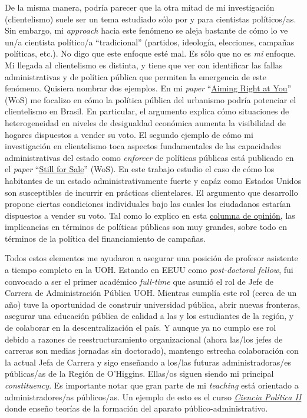 \documentclass[12pt,stdletter,dateno,sigleft]{newlfm} %
\begin{document}
\begin{newlfm}
De la misma manera, podr\'ia parecer que la otra mitad de mi investigaci\'on (clientelismo) suele ser un tema estudiado s\'olo por y para cientistas pol\'iticos/as. Sin embargo, mi \emph{approach} hacia este fen\'omeno se aleja bastante de c\'omo lo ve un/a cientista pol\'itico/a ``tradicional'' (partidos, ideolog\'ia, elecciones, campa\~nas pol\'iticas, etc.). No digo que este enfoque est\'e mal. Es s\'olo que no es \emph{mi} enfoque. Mi llegada al clientelismo es distinta, y tiene que ver con identificar las fallas administrativas y de pol\'itica p\'ublica que permiten la emergencia de este fen\'omeno. Quisiera nombrar dos ejemplos. En mi \emph{paper} ``\href{https://journals.sub.uni-hamburg.de/giga/jpla/article/view/1121/1128}{Aiming Right at You}'' (WoS) me focalizo en c\'omo la pol\'itica p\'ublica del urbanismo podr\'ia potenciar el clientelismo en Brasil. En particular, el argumento explica c\'omo situaciones de heterogeneidad en niveles de desigualdad econ\'omica aumenta la visibilidad de hogares dispuestos a vender su voto. El segundo ejemplo de c\'omo mi investigaci\'on en clientelismo toca aspectos fundamentales de las capacidades administrativas del estado como \emph{enforcer} de pol\'iticas p\'ublicas est\'a publicado en el \emph{paper} ``\href{https://doi.org/10.1057/s41269-020-00174-4}{Still for Sale}'' (WoS). En este trabajo estudio el caso de c\'omo los habitantes de un estado administrativamente fuerte y cap\'az como Estados Unidos son susceptibles de incurrir en pr\'acticas clientelares. El argumento que desarrollo propone ciertas condiciones individuales bajo las cuales los ciudadanos estar\'ian dispuestos a vender su voto. Tal como lo explico en esta \href{https://eltipografo.cl/2019/07/desigualdad-y-democracia-en-chile}{columna de opini\'on}, las implicancias en t\'erminos de pol\'iticas p\'ublicas son muy grandes, sobre todo en t\'erminos de la pol\'itica del financiamiento de campa\~nas.

Todos estos elementos me ayudaron a asegurar una posici\'on de profesor asistente a tiempo completo en la UOH. Estando en EEUU como \emph{post-doctoral fellow}, fui convocado a ser el primer acad\'emico \emph{full-time} que asumi\'o el rol de Jefe de Carrera de Administraci\'on P\'ublica UOH. Mientras cumpl\'ia este rol (cerca de un a\~no) tuve la oportunidad de construir universidad p\'ublica, abrir nuevas fronteras, asegurar una educaci\'on p\'ublica de calidad a las y los estudiantes de la regi\'on, y de colaborar en la descentralizaci\'on el pa\'is. Y aunque ya no cumplo ese rol debido a razones de reestructuramiento organizacional (ahora las/los jefes de carreras son medias jornadas sin doctorado), mantengo estrecha colaboraci\'on con la actual Jefa de Carrera y sigo ense\~nando a los/las futuras administradoras/es p\'ublicas/as de la Regi\'on de O'Higgins. Ellas/os siguen siendo mi principal \emph{constituency}. Es importante notar que gran parte de mi \emph{teaching} est\'a orientado a administradores/as p\'ublicos/as. Un ejemplo de esto es el curso \href{https://github.com/hbahamonde/Ciencia_Politica_I/raw/master/Bahamonde_Ciencia_Politica_I.pdf}{\emph{Ciencia Pol\'itica II}} donde ense\~no teor\'ias de la formaci\'on del aparato p\'ublico-administrativo. 


\end{newlfm}
\end{document}
